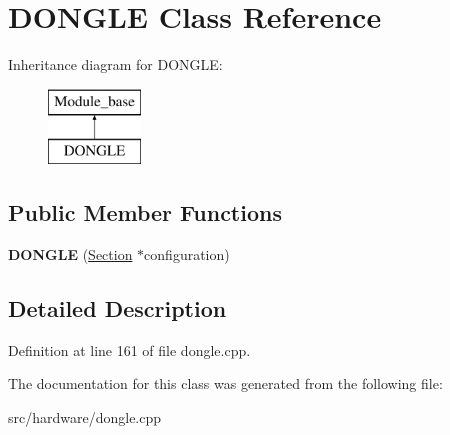 \hypertarget{classDONGLE}{\section{D\-O\-N\-G\-L\-E Class Reference}
\label{classDONGLE}
}
Inheritance diagram for D\-O\-N\-G\-L\-E\-:\begin{figure}[H]
\begin{center}
\leavevmode
\includegraphics[height=2.000000cm]{classDONGLE}
\end{center}
\end{figure}
\subsection*{Public Member Functions}
\begin{DoxyCompactItemize}
\item 
\hypertarget{classDONGLE_afb3fbec00c866f3b468329b81f4c4c35}{{\bfseries D\-O\-N\-G\-L\-E} (\hyperlink{classSection}{Section} $\ast$configuration)}\label{classDONGLE_afb3fbec00c866f3b468329b81f4c4c35}

\end{DoxyCompactItemize}


\subsection{Detailed Description}


Definition at line 161 of file dongle.\-cpp.



The documentation for this class was generated from the following file\-:\begin{DoxyCompactItemize}
\item 
src/hardware/dongle.\-cpp\end{DoxyCompactItemize}
